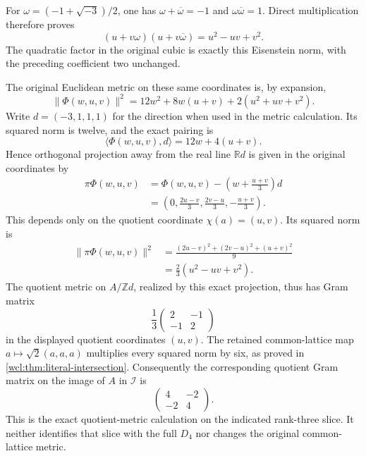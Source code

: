 For $\omega=(-1+\sqrt{-3})/2$, one has
$\omega+\overline\omega=-1$ and $\omega\overline\omega=1$.
Direct multiplication therefore proves
\[
                 (u+v\omega)(u+v\overline\omega)=u^2-uv+v^2.
 \label{d4i:eq:eisenstein-norm}\tag{D4I29}
\]
The quadratic factor in the original cubic is exactly this
Eisenstein norm, with the preceding coefficient two unchanged.

The original Euclidean metric on these same coordinates is,
by expansion,
\[
 \|\Phi(w,u,v)\|^2
            =12w^2+8w(u+v)+2(u^2+uv+v^2).
 \label{d4i:eq:full-slice-metric}\tag{D4I30}
\]
Write $d=(-3,1,1,1)$ for the direction when used in the metric
calculation. Its squared norm is twelve, and the exact pairing is
\[
          \langle\Phi(w,u,v),d\rangle=12w+4(u+v).
 \label{d4i:eq:direction-pairing}\tag{D4I31}
\]
Hence orthogonal projection away from the real line $\mathbb R d$
is given in the original coordinates by
\[
\begin{aligned}
 \pi\Phi(w,u,v)
  &=\Phi(w,u,v)-\left(w+\frac{u+v}{3}\right)d\\
  &=\left(0,\frac{2u-v}{3},\frac{2v-u}{3},-\frac{u+v}{3}\right).
\end{aligned}
 \label{d4i:eq:orthogonal-projection}\tag{D4I32}
\]
This depends only on the quotient coordinate $\chi(a)=(u,v)$.
Its squared norm is
\[
\begin{aligned}
 \|\pi\Phi(w,u,v)\|^2
  &=\frac{(2u-v)^2+(2v-u)^2+(u+v)^2}{9}\\
  &=\frac23(u^2-uv+v^2).
\end{aligned}
 \label{d4i:eq:projected-norm}\tag{D4I33}
\]
The quotient metric on $A/\mathbb Z d$, realized by this exact
projection, thus has Gram matrix
\[
              \frac13\begin{pmatrix}2&-1\\-1&2\end{pmatrix}
 \label{d4i:eq:quotient-gram}\tag{D4I34}
\]
in the displayed quotient coordinates $(u,v)$.
The retained common-lattice map $a\mapsto\sqrt2(a,a,a)$ multiplies
every squared norm by six, as proved in
\cref{wcl:thm:literal-intersection}. Consequently the corresponding
quotient Gram matrix on the image of $A$ in $\mathcal I$ is
\[
                         \begin{pmatrix}4&-2\\-2&4\end{pmatrix}.
 \label{d4i:eq:common-lattice-quotient-gram}\tag{D4I35}
\]
This is the exact quotient-metric calculation on the indicated
rank-three slice. It neither identifies that slice with the full
$D_4$ nor changes the original common-lattice metric.
